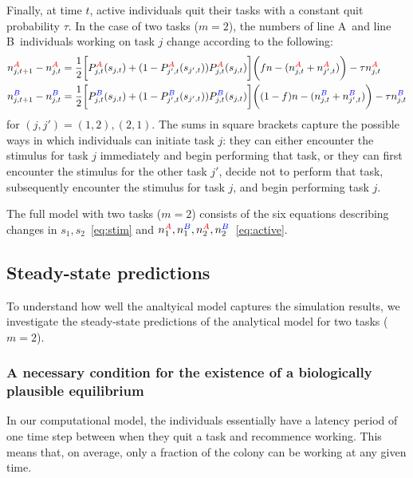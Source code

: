 \documentclass[11pt]{article}
\newcommand{\A}{{\color{red}A}}
\newcommand{\B}{{\color{blue}B}}
\begin{document}
\begin{appendices}
Finally, at time $t$, active individuals quit their tasks with a constant quit probability $\tau$. In the case of two tasks ($m = 2$), the numbers of line \A\ and line \B\ individuals working on task $j$ change according to the following:
\begin{align}
    n_{j,t+1}^{\A} - n_{j,t}^{\A}  & =  \frac{1}{2} \bigg[ P_{j,t}^{\A}(s_{j,t}) + (1 - P_{j',t}^{\A}(s_{j',t}))P_{j,t}^{\A}(s_{j,t})\bigg] \bigg( fn
 - (n_{j,t}^{\A} + n_{j',t}^{\A}) \bigg) - \tau n_{j,t}^{\A} \nonumber\\
    n_{j,t+1}^{\B} - n_{j,t}^{\B}  & = \frac{1}{2} \bigg[ P_{j,t}^{\B}(s_{j,t}) + (1 - P_{j',t}^{\B}(s_{j',t}))P_{j,t}^{\B}(s_{j,t})\bigg] \bigg( (1-f)n - (n_{j,t}^{\B} + n_{j',t}^{\B}) \bigg) - \tau n_{j,t}^{\B} \label{eq:active}
\end{align}
for $(j,j')=(1,2), (2,1)$. {\color{black}The sums in square brackets capture the possible ways in which individuals can initiate task $j$: they can either encounter the stimulus for task $j$ immediately and begin performing that task, or they can first encounter the stimulus for the other task $j'$, decide not to perform that task, subsequently encounter the stimulus for task $j$, and begin performing task $j$.}

The full model with two tasks ($m=2$) consists of the six equations describing changes in $s_1, s_2$~\eqref{eq:stim} and $ n_1^{\A}, n_1^{\B}, n_2^{\A}, n_2^{\B}$~\eqref{eq:active}. 

\newpage
\subsection{Steady-state predictions}
To understand how well the analtyical model captures the simulation results, we investigate the steady-state predictions of the analytical model for two tasks ($m=2$).

\subsubsection{A necessary condition for the existence of a biologically plausible equilibrium} \label{sec:maxactivity}

In our computational model, the individuals essentially have a latency period of one time step between when they quit a task and recommence working. This means that, on average, only a fraction of the colony can be working at any given time.


\end{appendices}
\end{document}
